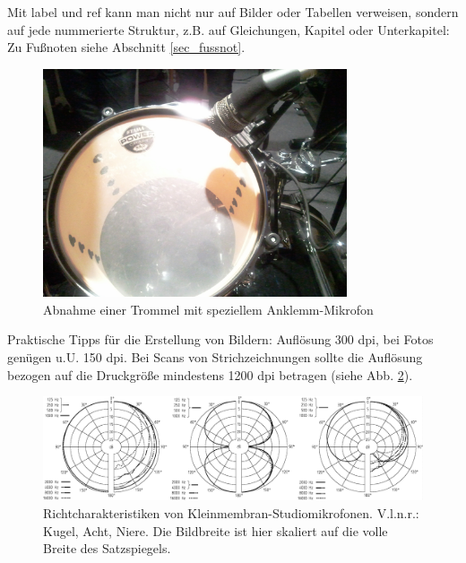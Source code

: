 Mit label und ref kann man nicht nur auf Bilder oder Tabellen verweisen, sondern auf jede nummerierte Struktur, z.B. auf Gleichungen, Kapitel oder Unterkapitel: Zu Fußnoten siehe Abschnitt \ref{sec_fussnot}. 

\begin{figure}[htp]     %
\centering
\includegraphics[width=0.8\textwidth]{bilder/drums} 
\caption{Abnahme einer Trommel mit speziellem Anklemm-Mikrofon}\label{b_trommelmik}
\end{figure}

Praktische Tipps für die Erstellung von Bildern: Auflösung 300 dpi, bei Fotos genügen u.U. 150 dpi. Bei Scans von Strichzeichnungen sollte die Auflösung bezogen auf die Druckgröße mindestens 1200 dpi betragen (siehe Abb. \ref{b_richtch}). 

\begin{figure}[htp]     %
\centering
\includegraphics[width=1.0\textwidth]{bilder/3x_richtchars}
\caption[Richtcharakteristiken von Kleinmembran-Studiomikrofonen]{Richtcharakteristiken von Kleinmembran-Studiomikrofonen. V.l.n.r.: Kugel, Acht, Niere. Die Bildbreite ist hier skaliert auf die volle Breite des Satzspiegels.}\label{b_richtch}
\end{figure}

